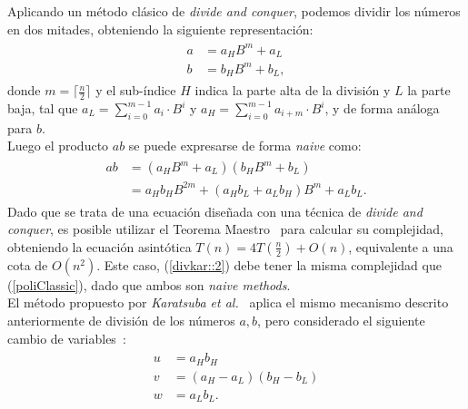 Aplicando un método clásico de \textit{divide and conquer}, podemos dividir los números en dos mitades, obteniendo la siguiente representación:
\begin{align}
\begin{split}
    a &= a_{H}B^{m}+a_{L}\\
    b &= b_{H}B^{m}+b_{L},
\end{split}\label{divkar::1}
\end{align}
donde $m=\lceil\frac{n}{2}\rceil$ y el sub-índice $H$ indica la parte alta de la división y $L$ la parte baja, tal que $a_{L}=\sum^{m-1}_{i=0}{a_{i}\cdot B^{i}}$ y $a_{H}=\sum^{m-1}_{i=0}{a_{i+m}\cdot B^{i}}$, y de forma análoga para $b$.\\

Luego el producto $ab$ se puede expresarse de forma \textit{naive} como:
\begin{align}
\begin{split}
    ab &= (a_{H}B^{m}+a_{L})(b_{H}B^{m}+b_{L})\\
    &= a_{H}b_{H}B^{2m} + (a_{H}b_{L} + a_{L}b_{H})B^{m} + a_{L}b_{L}.
\end{split}\label{divkar::2}
\end{align}
Dado que se trata de una ecuación diseñada con una técnica de \textit{divide and conquer}, es posible utilizar el Teorema Maestro~\cite{10.1145/1008861.1008865} para calcular su complejidad, obteniendo la ecuación asintótica $T(n)=4T(\frac{n}{2}) + O(n)$, equivalente a una cota de $O(n^2)$. Este caso, (\ref{divkar::2}) debe tener la misma complejidad que (\ref{poliClassic}), dado que ambos son \textit{naive methods}.\\

El método propuesto por \textit{Karatsuba et al.}~\cite{Karatsuba1962} aplica el mismo mecanismo descrito anteriormente de división de los números $a,b$, pero considerado el siguiente cambio de variables~\cite{luders2015fast}:
\begin{align}
\begin{split}
    u &= a_{H}b_{H}\\
    v &= (a_{H} - a_{L})(b_{H} - b_{L})\\
    w &= a_{L}b_{L}.
\end{split}\label{divkar::3}
\end{align}

